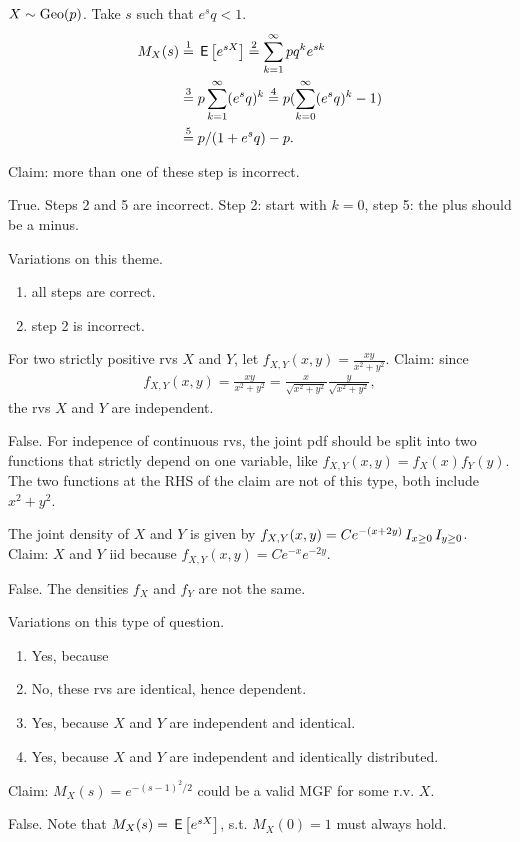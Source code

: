 \documentclass[tf-tutorial-all.tex]{subfiles}
\begin{document}
\begin{truefalse}
$X\sim \mathrm{Geo}(p)$. Take $s$ such that $e^{s}q < 1$.
\begin{align}
\label{eq:5}
M_{X}(s)
  &\stackrel{1}= \,\mathsf{E}\left[e^{sX}\right] \stackrel{2}= \sum_{k=1}^{\infty} p q^{k} e^{sk} \\
  &\stackrel{3}= p \sum_{k=1}^{\infty} (e^{s}q)^{k}
  \stackrel{4}= p (\sum_{k=0}^{\infty} (e^{s}q)^{k}-1) \\
&  \stackrel{5}= p /(1+e^{s}q)  - p.
\end{align}

Claim: more than one of these step is incorrect.
\begin{solution}
True. Steps 2 and 5 are incorrect. Step 2: start with $k=0$, step 5: the plus should be a minus.

Variations on this theme.
\begin{enumerate}
\item all steps are correct.
\item step 2 is incorrect.
\end{enumerate}
\end{solution}
\end{truefalse}


\begin{truefalse}
For two strictly positive rvs $X$ and $Y$, let $f_{X,Y}(x, y) = \frac{xy}{x^{2}+y^2}$. Claim: since
\begin{align*}
  f_{X,Y}(x, y) = \frac{xy}{x^{2}+y^2} = \frac{x}{\sqrt{x^{2}+y^2}} \frac{y}{\sqrt{x^{2}+y^2}},
\end{align*}
the rvs $X$ and $Y$ are independent.
\begin{solution}
False.
For indepence of continuous rvs, the joint pdf should be split into two functions that strictly depend on one variable, like $f_{X,Y}(x,y) = f_{X}(x) f_{Y}(y)$.
The two functions at the RHS of the claim are not of this type, both include $x^{2}+y^{2}$.
\end{solution}
\end{truefalse}


\begin{truefalse}
The joint density of $X$ and $Y$ is given by $f_{X,Y}(x,y) = Ce^{-(x + 2y)}\,I_{x\geq 0}\,I_{y\geq 0}$.
Claim:  $X$ and $Y$ iid because  $f_{X,Y}(x, y) = C e^{-x}e^{-2y}$.
\begin{solution}
False. The densities  $f_{X}$ and $f_{Y}$ are not the same.

Variations on this type of question.
\begin{enumerate}
\item Yes, because
\item No,  these rvs are identical, hence dependent.
\item Yes, because $X$ and $Y$ are independent and identical.
\item Yes, because $X$ and $Y$ are independent and identically distributed.
\end{enumerate}
\end{solution}
\end{truefalse}





\begin{truefalse}
Claim: $M_X(s)=e^{-(s-1)^2/2}$ could be a valid MGF for some r.v. $X$.
\begin{solution}
False. Note that $M_X(s)=\,\mathsf{E}\left[e^{sX}\right]$, s.t. $M_X(0)=1$ must always hold.
\end{solution}
\end{truefalse}
\end{document}
